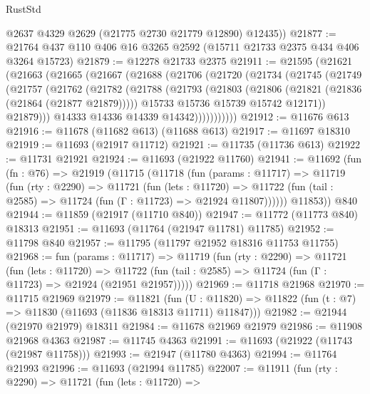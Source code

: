 \begin{lexlean}{RustStd}
\begin{coremodule}
        @2637
        @4329
        @2629
        (@21775 @2730 @21779 @12890)
        @12435))
@21877 := @21764 @437 @110 @406 @16 @3265 @2592 (@15711 @21733 @2375 @434 @406 @3264 @15723)
@21879 := @12278 @21733 @2375
@21911 := @21595
    (@21621
      (@21663
        (@21665
          (@21667
            (@21688
              (@21706
                (@21720
                  (@21734
                    (@21745
                      (@21749
                        (@21757
                          (@21762
                            (@21782
                              (@21788
                                (@21793
                                  (@21803
                                    (@21806 (@21821 (@21836 (@21864 (@21877 @21879)))))
                                    @15733
                                    @15736
                                    @15739
                                    @15742
                                    @12171))
                                @21879)))
                          @14333
                          @14336
                          @14339
                          @14342)))))))))))
@21912 := @11676 @613
@21916 := @11678 (@11682 @613) (@11688 @613)
@21917 := @11697 @18310
@21919 := @11693 (@21917 @11712)
@21921 := @11735 (@11736 @613)
@21922 := @11731 @21921
@21924 := @11693 (@21922 @11760)
@21941 := @11692
    (fun (fn : @76) =>
    @21919
      (@11715
        (@11718
          (fun (params : @11717) =>
          @11719
            (fun (rty : @2290) =>
            @11721
              (fun (lets : @11720) =>
              @11722 (fun (tail : @2585) => @11724 (fun (Γ : @11723) => @21924 @11807))))))
        @11853))
    @840
@21944 := @11859 (@21917 (@11710 @840))
@21947 := @11772 (@11773 @840) @18313
@21951 := @11693 (@11764 (@21947 @11781) @11785)
@21952 := @11798 @840
@21957 := @11795 (@11797 @21952 @18316 @11753 @11755)
@21968 := fun (params : @11717) =>
  @11719
    (fun (rty : @2290) =>
    @11721
      (fun (lets : @11720) =>
      @11722 (fun (tail : @2585) => @11724 (fun (Γ : @11723) => @21924 (@21951 @21957)))))
@21969 := @11718 @21968
@21970 := @11715 @21969
@21979 := @11821
    (fun (U : @11820) => @11822 (fun (t : @7) => @11830 (@11693 (@11836 @18313 @11711) @11847)))
@21982 := @21944 (@21970 @21979) @18311
@21984 := @11678 @21969 @21979
@21986 := @11908 @21968 @4363
@21987 := @11745 @4363
@21991 := @11693 (@21922 (@11743 (@21987 @11758)))
@21993 := @21947 (@11780 @4363)
@21994 := @11764 @21993
@21996 := @11693 (@21994 @11785)
@22007 := @11911
    (fun (rty : @2290) =>
    @11721
      (fun (lets : @11720) =>

\end{coremodule}
\end{lexlean}

